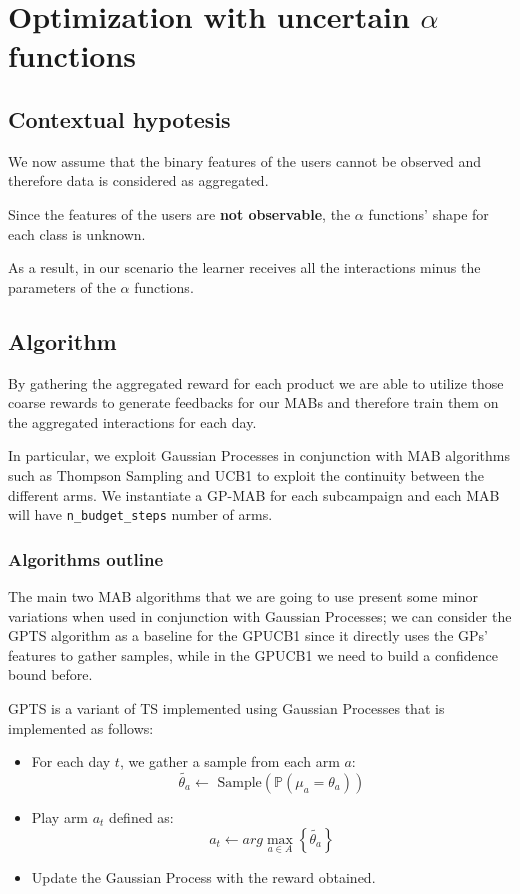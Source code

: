 \chapter{Optimization with uncertain \texorpdfstring{$\alpha$}{alpha} functions}
\label{chap:unc_alpha}

\section{Contextual hypotesis}

We now assume that the binary features of the users cannot be observed and therefore data is considered as aggregated.

Since the features of the users are \textbf{not observable}, the $\alpha$ functions' shape for each class is unknown.

As a result, in our scenario the learner receives all the interactions minus the parameters of the $\alpha$ functions.

\section{Algorithm}

By gathering the aggregated reward for each product we are able to utilize those coarse rewards to generate feedbacks for our MABs and therefore train them on the aggregated interactions for each day.

In particular, we exploit Gaussian Processes in conjunction with MAB algorithms such as Thompson Sampling and UCB1 to exploit the continuity between the different arms.
We instantiate a GP-MAB for each subcampaign and each MAB will have \texttt{n\_budget\_steps} number of arms.

\subsection{Algorithms outline}

The main two MAB algorithms that we are going to use present some minor variations when used in conjunction with Gaussian Processes; we can consider the GPTS algorithm as a baseline for the GPUCB1 since it directly uses the GPs' features to gather samples, while in the GPUCB1 we need to build a confidence bound before.

GPTS is a variant of TS implemented using Gaussian Processes that is implemented as follows:

\begin{itemize}
	\item For each day $t$, we gather a sample from each arm $a$:
		\begin{displaymath}
			\tilde{\theta_a} \leftarrow \text{ Sample} \left( \mathbb{P}(\mu_a = \theta_a) \right)
		\end{displaymath}
	\item Play arm $a_t$ defined as:
		\begin{displaymath}
			a_t \leftarrow arg\max_{a \in A} \left\{ \tilde{\theta_a} \right\}
		\end{displaymath}
	\item Update the Gaussian Process with the reward obtained.
\end{itemize}

